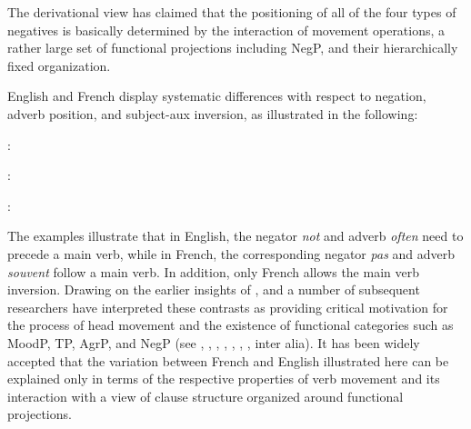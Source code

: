 \documentclass[output=paper]{langsci/langscibook}
\begin{document}
{The derivational view has claimed that the positioning of all of the
four types of negatives is basically determined by the interaction of movement
operations, a rather large set of functional projections including NegP,
and their hierarchically fixed organization.


English and French display systematic differences with respect
to negation, adverb position, and subject-aux inversion, as illustrated
in the following:
%


\bigskip

:

\eal\label{exe:1}
\zl

\eal
{}
\zl

:

\eal
{}
\zl

\eal
{}
\zl

:

\eal
{}
\zl


\eal
{}
\zl




The examples illustrate that in English, the negator {\it not}
and adverb {\it often} need to precede a main verb, while in French,
the corresponding negator {\it pas} and adverb {\it souvent} follow
a main verb. In addition, only French allows the main verb inversion.
Drawing on the earlier insights of \citet{Emonds:78},
\citet{Pollock:89,Pollock:94} and a number of subsequent researchers
have interpreted these contrasts as providing critical motivation for
the process of head movement and the existence of functional
categories such as MoodP, TP, AgrP, and NegP (see \citet{Belletti:90}, \citet{Zanuttini:91,Zanuttini:97,Zanuttini:01}, \citet{Chomsky:91,Chomsky:93,Chomsky:95}, \citet{Lasnik:95}, \citet{Haegeman:95,Haegeman:97}, \citet{Vikner:97}, \citet{Zeijlstra:15}, inter alia).
It has been widely
accepted that the variation between French and English illustrated
here can be explained only in terms of the respective properties
of verb movement and its interaction with a view of clause
structure organized around functional projections.

}
\end{document}
